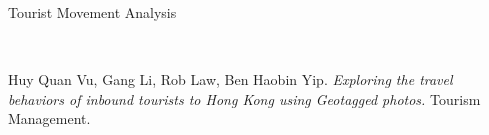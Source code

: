 \documentclass[
 size=14pt,
 paper=smartboard,  %
 mode=present, 		%
 display=slides, 	%
 style=tuliplab,  	%
 pauseslide,
 fleqn,leqno]{powerdot}
\begin{document}
\begin{slide}[toc=,bm=]{Tourist Movement Analysis}

\begin{figure}[htbp]
    \\
\end{figure}

\footnotesize{Huy Quan Vu, Gang Li, Rob Law, Ben Haobin Yip.
\emph{Exploring the travel behaviors of inbound tourists to Hong Kong using Geotagged photos. }
Tourism Management.}

\end{slide}
\end{document}
